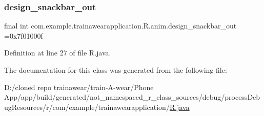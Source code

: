 \subsubsection{\texorpdfstring{design\_snackbar\_out}{design\_snackbar\_out}}
{\footnotesize\ttfamily final int com.\+example.\+trainawearapplication.\+R.\+anim.\+design\+\_\+snackbar\+\_\+out =0x7f01000f\hspace{0.3cm}{\ttfamily [static]}}



Definition at line 27 of file R.\+java.



The documentation for this class was generated from the following file\+:\begin{DoxyCompactItemize}
\item 
D\+:/cloned repo trainawear/train-\/\+A-\/wear/\+Phone App/app/build/generated/not\+\_\+namespaced\+\_\+r\+\_\+class\+\_\+sources/debug/process\+Debug\+Resources/r/com/example/trainawearapplication/\mbox{\hyperlink{process_debug_resources_2r_2com_2example_2trainawearapplication_2_r_8java}{R.\+java}}\end{DoxyCompactItemize}
